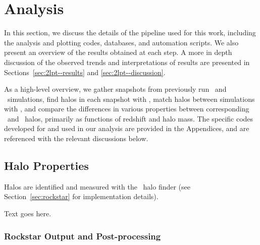
%
%

\section{Analysis}
\label{sec:analysis}



In this section, we discuss the details of the pipeline used for this work, including the analysis and plotting codes, databases, and automation scripts.  We also present an overview of the results obtained at each step.  A more in depth discussion of the observed trends and interpretations of results are presented in Sections~\ref{sec:2lpt--results} and \ref{sec:2lpt--discussion}.

As a high-level overview, we gather snapshots from previously run \lpt\ and \za\ simulations, find halos in each snapshot with \rockstar, match halos between simulations with \crossmatch, and compare the differences in various properties between corresponding \lpt\ and \za\ halos, primarily as functions of redshift and halo mass.  The specific codes developed for and used in our analysis are provided in the Appendices, and are referenced with the relevant discussions below.




\subsection{Halo Properties}
\label{subsec:analysis--halo_properties}


Halos are identified and measured with the \rockstar\ halo finder (see Section~\ref{sec:rockstar} for implementation details).

Text goes here.



\subsubsection{Rockstar Output and Post-processing}
\label{subsubsec:analysis--halo_properties--output}


